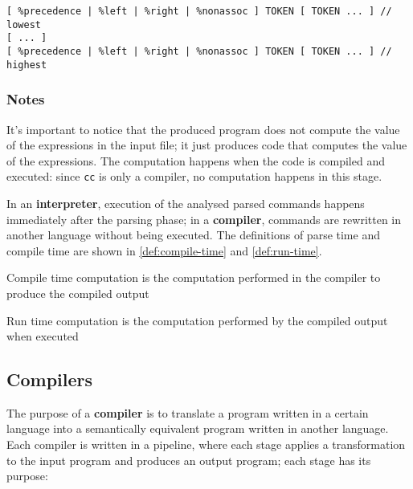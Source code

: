 \documentclass[english]{article}
\begin{document}
\begin{onepage}
  \begin{lstlisting}[language=LANCE, caption={Precedence and Associativity declaration}, label={lst:bison-precedence-associativity-declaration}]
[ %precedence | %left | %right | %nonassoc ] TOKEN [ TOKEN ... ] // lowest
[ ... ]
[ %precedence | %left | %right | %nonassoc ] TOKEN [ TOKEN ... ] // highest
\end{lstlisting}
\end{onepage}

\subsubsection{Notes}

It's important to notice that the produced program does not compute the value of the expressions in the input file;
it just produces \clang code that computes the value of the expressions.
The computation happens when the \clang code is compiled and executed:
since \texttt{cc} is only a compiler, no computation happens in this stage.

In an \textbf{interpreter}, execution of the analysed parsed commands happens immediately after the parsing phase;
in a \textbf{compiler}, commands are rewritten in another language without being executed.
The definitions of parse time and compile time are shown in \ref{def:compile-time} and \ref{def:run-time}.

\begin{definition}
  \label{def:compile-time}
  Compile time computation is the computation performed in the compiler to produce the compiled output
\end{definition}

\begin{definition}
  \label{def:run-time}
  Run time computation is the computation performed by the compiled output when executed
\end{definition}

\subsection{Compilers}

The purpose of a \textbf{compiler} is to translate a program written in a certain language into a semantically equivalent program written in another language.
Each compiler is written in a pipeline, where each stage applies a transformation to the input program and produces an output program;
each stage has its purpose:
\end{document}

